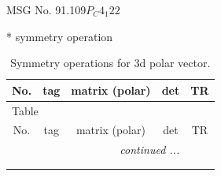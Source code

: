 \documentclass[fleqn,8pt]{jsarticle}
\begin{document}
\setcounter{MaxMatrixCols}{32}

\renewcommand{\tablename}{Table~}
\renewcommand{\figurename}{Figure~}
\begin{center}
\LARGE
MSG No. 91.109\quad$P_{C}4_{1}22$
\end{center}
* symmetry operation
\renewcommand{\arraystretch}{1.3}
\begin{longtable}{ccccc}
\caption{Symmetry operations for 3d polar vector.}
 \\
 \hline \hline
No. & tag & matrix (polar) & det & TR \\ \hline \endfirsthead

\multicolumn{4}{l}{\tablename\ \thetable{}} \\
 \hline \hline
No. & tag & matrix (polar) & det & TR \\ \hline \endhead

 \hline \hline
\multicolumn{4}{r}{\footnotesize\it continued ...} \\ \endfoot

 \hline \hline
\multicolumn{4}{r}{} \\ \endlastfoot


\end{longtable}
\end{document}
